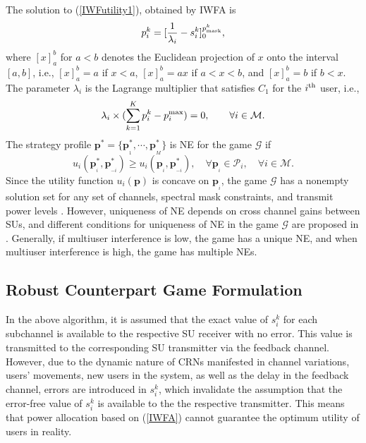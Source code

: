\documentclass[peerreview,onecolumn,11pt,draftclsnofoot]{IEEEtran}\usepackage{amsmath}\usepackage{amsfonts}\usepackage{epsfig}\usepackage{amssymb}\usepackage{graphicx}\usepackage{amssymb,amsmath}\usepackage{cite}\usepackage{color,soul}\newcommand\T{\rule{0pt}{3.1ex}}
\begin{document}
The solution to (\ref{IWFutility1}), obtained by IWFA is
\begin{equation}\label{IWFA}
   p_{i}^{k}=[\frac{1}{\lambda_{i}}-s^{k}_{i}]^{p^{k}_{\scriptsize{\textnormal{mask}}}}_{0},
\end{equation}
where $[x]^{b}_{a}$  for $a<b$ denotes the Euclidean projection
of $x$ onto the interval $[a,b]$, i.e., $[x]^{b}_{a}=a$ if $x<a$, $[x]^{b}_{a}=ax$ if $a<x<b$, and $[x]^{b}_{a}=b$ if $b<x$. The parameter $\lambda_{i}$ is the Lagrange multiplier that satisfies $C_1$ for the $i^{{\scriptsize{\textnormal{th}}}}$ user, i.e.,
\begin{eqnarray}\label{optimaloptlambda}
\lambda_{i} \times (\sum^{K}_{k=1}p_{i}^{k}-
p_{i}^{\scriptsize{\textnormal{max}}})=0,  \qquad\forall i \in
\mathcal{M}.
\end{eqnarray}
The strategy profile
$\mathbf{p}^{*}=\{\mathbf{p}^{*}_{_1},\cdots,\mathbf{p}^{*}_{_M}\}$ is NE for the game $\mathcal{G}$ if
\begin{equation}\label{NEpoint}
 u_{i}(\mathbf{p}^{*}_{_i},\mathbf{p}^{*}_{_{-i}})\geq
 u_{i}(\mathbf{p}_{_i},\mathbf{p}^{*}_{_{-i}}), \quad \forall \mathbf{p}_{_{i}} \in \mathcal{P}_i, \quad \forall i \in \mathcal{M}.
\end{equation}
Since the utility function $u_{i}(\mathbf{p})$ is concave on $\mathbf{p}_{_i}$, the game $\mathcal{G}$ has a nonempty solution set for any set of channels, spectral mask constraints, and transmit power levels \cite{NEexistence}. However, uniqueness of NE depends on cross channel gains between SUs, and different conditions for uniqueness of NE in the game $\mathcal{G}$ are proposed in \cite{Nash1}. Generally, if multiuser interference is low, the game has a unique NE, and when multiuser interference is high, the game has multiple NEs.

\subsection{Robust Counterpart Game Formulation}
In the above algorithm, it is assumed that the exact value of $s_{i}^{k}$ for each subchannel is available to the respective SU receiver with no error. This value is transmitted to the corresponding SU transmitter via the feedback channel. However, due to the dynamic nature of CRNs manifested in channel variations, users' movements, new users in the system, as well as the delay in the feedback channel, errors are introduced in $s_{i}^{k}$, which invalidate the assumption that the error-free value of $s_{i}^{k}$ is available to the the respective transmitter. This means that power allocation based on (\ref{IWFA}) cannot guarantee the optimum utility of users in reality.
\end{document}
